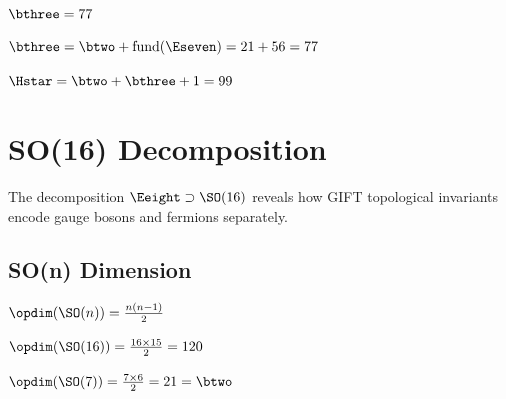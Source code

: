 \begin{theorem}[b3 Value]\label{thm:b3_eq}
    \leanok
    $\bthree = 77$
\end{theorem}

\begin{theorem}[b3 from E7]\label{thm:b3_from_E7}
    \leanok
    $\bthree = \btwo + \mathrm{fund}(\Eseven) = 21 + 56 = 77$
\end{theorem}

\begin{definition}[H-star]\label{def:H_star}
    \leanok
    $\Hstar = \btwo + \bthree + 1 = 99$
\end{definition}

\chapter{SO(16) Decomposition}\label{chap:so16}

The decomposition $\Eeight \supset \SO(16)$ reveals how GIFT topological invariants
encode gauge bosons and fermions separately.

\section{SO(n) Dimension}

\begin{definition}[SO(n) Dimension]\label{def:dim_SO}
    \leanok
    $\opdim(\SO(n)) = \frac{n(n-1)}{2}$
\end{definition}

\begin{theorem}[SO(16) = 120]\label{thm:dim_SO16}
    \leanok
    $\opdim(\SO(16)) = \frac{16 \times 15}{2} = 120$
\end{theorem}

\begin{theorem}[SO(7) = b2]\label{thm:dim_SO7}
    \leanok
    $\opdim(\SO(7)) = \frac{7 \times 6}{2} = 21 = \btwo$
\end{theorem}

